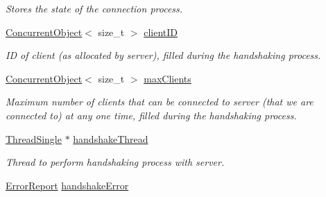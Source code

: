\begin{DoxyCompactItemize}
\begin{DoxyCompactList}\small\item\em Stores the state of the connection process. \item\end{DoxyCompactList}\item 
\hypertarget{class_net_instance_client_abc188a88da7ab851bc3ac4d9287fe342}{
\hyperlink{class_concurrent_object}{ConcurrentObject}$<$ size\_\-t $>$ \hyperlink{class_net_instance_client_abc188a88da7ab851bc3ac4d9287fe342}{clientID}}
\label{class_net_instance_client_abc188a88da7ab851bc3ac4d9287fe342}

\begin{DoxyCompactList}\small\item\em ID of client (as allocated by server), filled during the handshaking process. \item\end{DoxyCompactList}\item 
\hypertarget{class_net_instance_client_ad07bedf8749aa191a16bfd72434bd80d}{
\hyperlink{class_concurrent_object}{ConcurrentObject}$<$ size\_\-t $>$ \hyperlink{class_net_instance_client_ad07bedf8749aa191a16bfd72434bd80d}{maxClients}}
\label{class_net_instance_client_ad07bedf8749aa191a16bfd72434bd80d}

\begin{DoxyCompactList}\small\item\em Maximum number of clients that can be connected to server (that we are connected to) at any one time, filled during the handshaking process. \item\end{DoxyCompactList}\item 
\hypertarget{class_net_instance_client_ade1e8bb0bc0cdfefa23aa56c63dc72dd}{
\hyperlink{class_thread_single}{ThreadSingle} $\ast$ \hyperlink{class_net_instance_client_ade1e8bb0bc0cdfefa23aa56c63dc72dd}{handshakeThread}}
\label{class_net_instance_client_ade1e8bb0bc0cdfefa23aa56c63dc72dd}

\begin{DoxyCompactList}\small\item\em Thread to perform handshaking process with server. \item\end{DoxyCompactList}\item 
\hypertarget{class_net_instance_client_a9c9b110b29ed61db3c5e92e5040fcc6f}{
\hyperlink{class_error_report}{ErrorReport} \hyperlink{class_net_instance_client_a9c9b110b29ed61db3c5e92e5040fcc6f}{handshakeError}}
\label{class_net_instance_client_a9c9b110b29ed61db3c5e92e5040fcc6f}


\end{DoxyCompactItemize}
